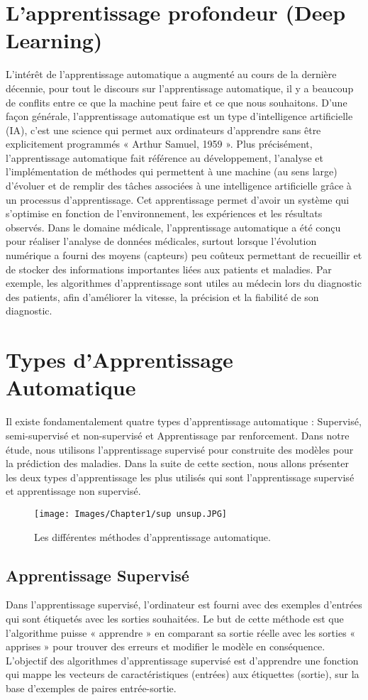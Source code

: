 \section{L'apprentissage profondeur (Deep Learning) }
L’intérêt de l’apprentissage automatique a augmenté au cours de la dernière décennie, pour tout le discours sur l’apprentissage automatique, il y a beaucoup de conflits entre ce que la machine peut faire et ce que nous souhaitons.
 D’une façon générale, l'apprentissage automatique est un type d'intelligence artificielle (IA), c’est une science qui permet aux ordinateurs d'apprendre sans être explicitement programmés « Arthur Samuel, 1959 ». Plus précisément, l'apprentissage automatique fait référence au développement, l'analyse et l'implémentation de méthodes qui permettent à une machine (au sens large) d'évoluer et de remplir des tâches associées à une intelligence artificielle grâce à un processus d'apprentissage. Cet apprentissage permet d'avoir un système qui s'optimise en fonction de l'environnement, les expériences et les résultats observés.
Dans le domaine médicale, l’apprentissage automatique a été conçu pour réaliser l'analyse de données médicales, surtout lorsque l'évolution numérique a fourni des moyens (capteurs) peu coûteux permettant de recueillir et de stocker des informations importantes liées aux patients et maladies. Par exemple, les algorithmes d'apprentissage sont utiles au médecin lors du diagnostic des patients, afin d'améliorer la vitesse, la précision et la fiabilité de son diagnostic.

\section{Types d’Apprentissage Automatique  }
Il existe fondamentalement quatre types d’apprentissage automatique : Supervisé, semi-supervisé et non-supervisé et Apprentissage par renforcement. 
Dans notre étude, nous utilisons l’apprentissage supervisé pour construite des modèles pour la prédiction des maladies.
Dans la suite de cette section, nous allons présenter les deux types d’apprentissage les plus utilisés qui sont l’apprentissage supervisé et apprentissage non supervisé.
\begin{figure}[h]
    \centering
    \texttt{[image: Images/Chapter1/sup unsup.JPG]}
    \caption{Les différentes méthodes d'apprentissage automatique.}
    \label{fig:01}
    \end{figure}
    \subsection{Apprentissage Supervisé }
    Dans l'apprentissage supervisé, l'ordinateur est fourni avec des exemples d'entrées qui sont étiquetés avec les sorties souhaitées. Le but de cette méthode est que l'algorithme puisse « apprendre » en comparant sa sortie réelle avec les sorties « apprises » pour trouver des erreurs et modifier le modèle en conséquence. 
L'objectif des algorithmes d'apprentissage supervisé est d'apprendre une fonction qui mappe les vecteurs de caractéristiques (entrées) aux étiquettes (sortie), sur la base d'exemples de paires entrée-sortie.  

